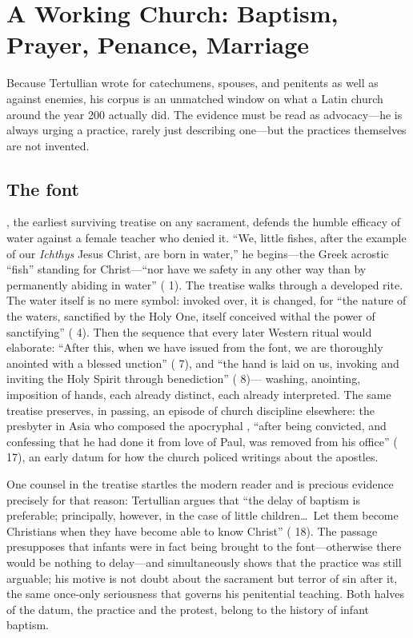 \section{A Working Church: Baptism, Prayer, Penance, Marriage}

Because Tertullian wrote for catechumens, spouses, and penitents as well as
against enemies, his corpus is an unmatched window on what a Latin church
around the year 200 actually did. The evidence must be read as advocacy---he is
always urging a practice, rarely just describing one---but the practices
themselves are not invented.

\subsection{The font}

, the earliest surviving treatise on any sacrament, defends
the humble efficacy of water against a female teacher who denied it.
``We, little fishes, after the example of our \textit{Ichthys} Jesus
Christ, are born in water,'' he begins---the Greek acrostic ``fish'' standing
for Christ---``nor have we safety in any other way than by permanently abiding
in water'' ( 1). The treatise walks through a
developed rite. The water itself is no mere symbol: invoked over, it is
changed, for ``the nature of the waters, sanctified by the Holy One, itself
conceived withal the power of sanctifying'' ( 4). Then the
sequence that every later Western ritual would elaborate: ``After this, when
we have issued from the font, we are thoroughly anointed with a blessed
unction'' ( 7), and ``the hand is laid on us, invoking and
inviting the Holy Spirit through benediction'' ( 8)---
washing, anointing, imposition of hands, each already distinct, each already
interpreted. The same treatise preserves, in passing, an episode of church
discipline elsewhere: the presbyter in Asia who composed the apocryphal
, ``after being convicted, and confessing that he
had done it from love of Paul, was removed from his office'' (
17), an early datum for how the church policed writings about the apostles.

One counsel in the treatise startles the modern reader and is precious
evidence precisely for that reason: Tertullian argues that ``the delay of
baptism is preferable; principally, however, in the case of little
children\ldots\ Let them become Christians when they have become able to know
Christ'' ( 18). The passage presupposes that infants were in
fact being brought to the font---otherwise there would be nothing to
delay---and simultaneously shows that the practice was still arguable; his
motive is not doubt about the sacrament but terror of sin after it, the same
once-only seriousness that governs his penitential teaching. Both halves of
the datum, the practice and the protest, belong to the history of infant
baptism.

